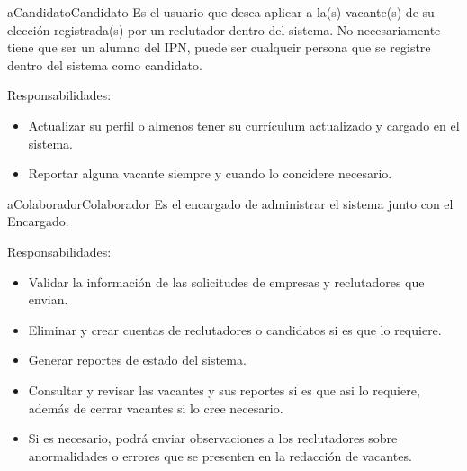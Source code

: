 \begin{actor}{aCandidato}{Candidato}{%
    Es el usuario que desea aplicar a la(s) vacante(s) de su elección registrada(s) por un reclutador dentro del sistema.
    No necesariamente tiene que ser un alumno del IPN, puede ser cualqueir persona que se registre dentro del sistema como candidato.}
     \item[Responsabilidades:] \hfill
     \begin{itemize}
         \item  Actualizar su perfil o almenos tener su currículum actualizado y cargado en el sistema.
         \item  Reportar alguna vacante siempre y cuando lo concidere necesario.
     \end{itemize}
 \end{actor}

 \begin{actor}{aColaborador}{Colaborador}{%
    Es el encargado de administrar el sistema junto con el Encargado.}
    \item[Responsabilidades:] \hfill
    \begin{itemize}
        \item Validar la información de las solicitudes de empresas y reclutadores que envian.
        \item Eliminar y crear cuentas de reclutadores o candidatos si es que lo requiere.
        \item Generar reportes de estado del sistema.
        \item Consultar y revisar las vacantes y sus reportes si es que asi lo requiere, además de cerrar vacantes si lo cree necesario.
        \item Si es necesario, podrá enviar observaciones a los reclutadores sobre anormalidades o errores que se presenten en la redacción de vacantes.
    \end{itemize}

\end{actor}

